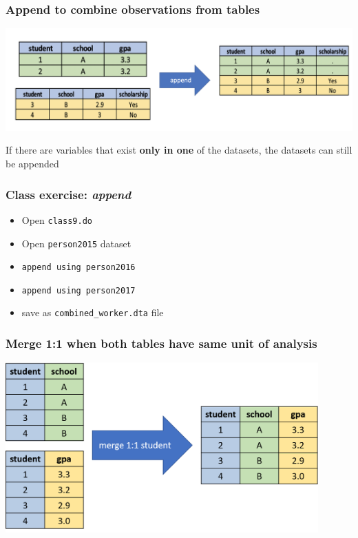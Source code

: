 \documentclass[11pt]{beamer}
\begin{document}
\begin{frame}
\frametitle{Append to combine observations from tables}
\begin{center}
	\includegraphics[width=\textwidth]{images/append2.png}
\end{center} 
If there are variables that exist \textbf{only in one} of the datasets, the datasets can still be appended
\end{frame}


\begin{frame}
\frametitle{Class exercise: \textit{append}}
\begin{itemize}
\item Open \texttt{class9.do} 
\item Open \texttt{person2015} dataset
\item \texttt{append using person2016}
\item \texttt{append using person2017}
\item save as \texttt{combined\_worker.dta} file
\end{itemize}
\end{frame}



\begin{frame}
\frametitle{Merge 1:1 when both tables have same unit of analysis}
\begin{center}
	\includegraphics[width=0.9\textwidth]{images/merge_one.png}
\end{center} 
\end{frame}
\end{document}
